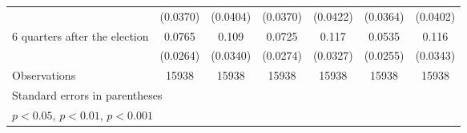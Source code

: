 \begin{table}[htbp]
\begin{tabular}{l*{6}{c}}
                    &    (0.0370)         &    (0.0404)         &    (0.0370)         &    (0.0422)         &    (0.0364)         &    (0.0402)         \\
[1em]
 6 quarters after the election&      0.0765\sym{**} &       0.109\sym{**} &      0.0725\sym{**} &       0.117\sym{***}&      0.0535\sym{*}  &       0.116\sym{***}\\
                    &    (0.0264)         &    (0.0340)         &    (0.0274)         &    (0.0327)         &    (0.0255)         &    (0.0343)         \\
\hline
Observations        &       15938         &       15938         &       15938         &       15938         &       15938         &       15938         \\
\hline\hline
\multicolumn{7}{l}{\footnotesize Standard errors in parentheses}\\
\multicolumn{7}{l}{\footnotesize \sym{*} \(p<0.05\), \sym{**} \(p<0.01\), \sym{***} \(p<0.001\)}\\
\end{tabular}
\end{table}
